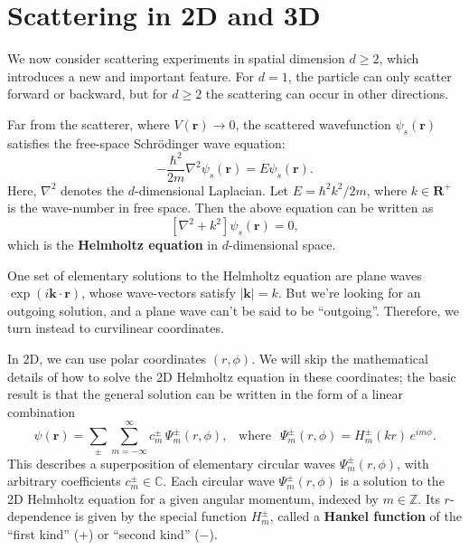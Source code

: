 \documentclass[pra,12pt]{revtex4}
\begin{document}
\section{Scattering in 2D and 3D}
\label{sec:2d3d_scattering}

We now consider scattering experiments in spatial dimension $d \ge 2$,
which introduces a new and important feature.  For $d = 1$, the
particle can only scatter forward or backward, but for $d \ge 2$ the
scattering can occur in other directions.

Far from the scatterer, where $V(\mathbf{r})\rightarrow 0$, the
scattered wavefunction $\psi_s(\mathbf{r})$ satisfies the free-space
Schr\"odinger wave equation:
\begin{equation}
  -\frac{\hbar^2}{2m} \nabla^2 \psi_s(\mathbf{r}) = E \psi_s(\mathbf{r}).
\end{equation}
Here, $\nabla^2$ denotes the $d$-dimensional Laplacian.  Let $E =
\hbar^2 k^2 / 2m$, where $k \in \mathbf{R}^+$ is the wave-number in
free space.  Then the above equation can be written as
\begin{equation}
  \left[\nabla^2 + k^2\right] \psi_s(\mathbf{r}) = 0,
\end{equation}
which is the \textbf{Helmholtz equation} in $d$-dimensional space.

One set of elementary solutions to the Helmholtz equation are plane
waves $\exp(i\mathbf{k}\cdot\mathbf{r})$, whose wave-vectors satisfy
$|\mathbf{k}| = k$.  But we're looking for an outgoing solution, and
a plane wave can't be said to be ``outgoing''.  Therefore, we turn
instead to curvilinear coordinates.

In 2D, we can use polar coordinates $(r,\phi)$.  We will skip the
mathematical details of how to solve the 2D Helmholtz equation in
these coordinates; the basic result is that the general solution can
be written in the form of a linear combination
\begin{equation}
  \psi(\mathbf{r})=\sum_{\pm}\sum_{m=-\infty}^\infty c_m^\pm\,\Psi_m^\pm(r,\phi), \;\;\;\mathrm{where}\;\;\,\Psi_m^\pm(r,\phi) = H_m^\pm(kr)\,e^{im\phi}.
\end{equation}
This describes a superposition of elementary circular waves
$\Psi_m^\pm(r,\phi)$, with arbitrary coefficients $c_m^\pm \in
\mathbb{C}$.  Each circular wave $\Psi_m^\pm(r,\phi)$ is a solution to
the 2D Helmholtz equation for a given angular momentum, indexed by $m
\in \mathbb{Z}$.  Its $r$-dependence is given by the special function
$H_m^\pm$, called a \textbf{Hankel function} of the ``first kind''
($+$) or ``second kind'' ($-$).
\end{document}
